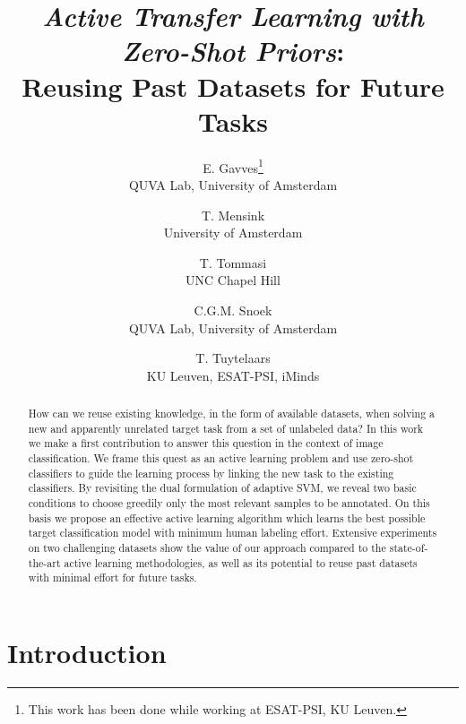 \documentclass[10pt,twocolumn,letterpaper]{article}
\begin{document}
\title{\emph{Active Transfer Learning with Zero-Shot Priors}:\\ Reusing Past Datasets for Future Tasks}

\author{E. Gavves\thanks{This work has been done while working at ESAT-PSI, KU Leuven.}\\
QUVA Lab, University of Amsterdam\\
\and
T. Mensink\\
University of Amsterdam\\
\and
T. Tommasi\footnotemark[1]\\
UNC Chapel Hill\\
\and
C.G.M. Snoek\\
QUVA Lab, University of Amsterdam\\
\and
T. Tuytelaars\\
KU Leuven, ESAT-PSI, iMinds\\
}

\maketitle


\begin{abstract}
How can we reuse existing knowledge, in the form of available  datasets, when solving a new and apparently unrelated target task from a set of unlabeled data? 
In this work we make a first contribution to answer this question in the context of image classification. 
We frame this quest as an active learning problem and use zero-shot 
classifiers to guide the learning process by linking the new task to the
existing classifiers.
By revisiting the dual formulation of adaptive SVM, we reveal two basic conditions to choose greedily only the most relevant samples to be annotated. 
On this basis we propose an effective active learning algorithm which learns the best possible target classification model with minimum human labeling effort. 
Extensive experiments on two challenging datasets show the value of our approach compared to the state-of-the-art active learning methodologies, as well as its potential to reuse past datasets with minimal effort for future tasks.
\end{abstract}

\section{Introduction}
\end{document}
